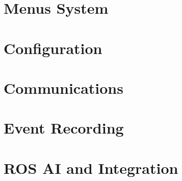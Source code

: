 \documentclass{report}
\begin{document}
\tableofcontents
\newpage

\chapter{Menus System}


\chapter{Configuration}


\chapter{Communications}


\chapter{Event Recording}


\chapter{ROS AI and Integration}

\end{document}
